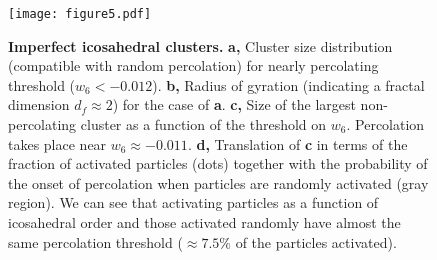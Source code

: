 \begin{figure}
\begin{center}

\texttt{[image: figure5.pdf]}
\end{center}
	\caption{\textbf{Imperfect icosahedral clusters.} \textbf{a,} Cluster size distribution (compatible with random percolation) for nearly percolating threshold ($w_6<-0.012$). 
\textbf{b,} Radius of gyration (indicating a fractal dimension $d_f\approx 2$) for the case of {\bf a}. \textbf{c,} Size of the largest non-percolating cluster as a function of the threshold on $w_6$. Percolation takes place near $w_6\approx -0.011$. \textbf{d,} Translation of \textbf{c} in terms of the fraction of activated particles (dots) together with the probability of the onset of percolation when particles are randomly activated (gray region). We can see that activating particles as a function of icosahedral order and 
those activated randomly have almost the same percolation threshold ($\approx7.5\%$ of the particles activated).}
	\label{fig:percolation}
\end{figure}


